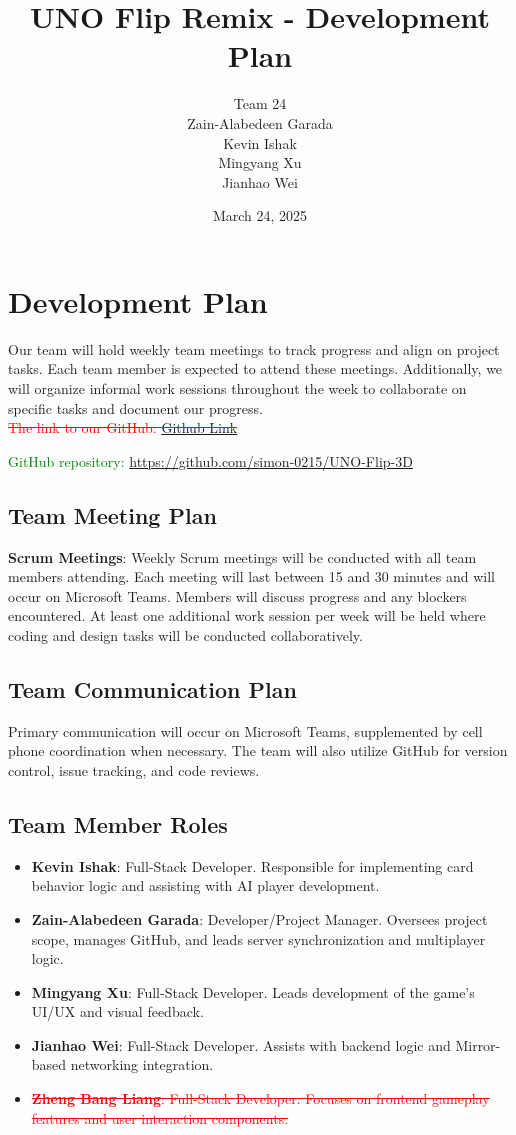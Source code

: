 \documentclass[12pt]{article}
\title{UNO Flip Remix - Development Plan}
\author{Team 24 \\ Zain-Alabedeen Garada \\ Kevin Ishak \\ Mingyang Xu \\ Jianhao Wei \\ \removed{Zheng Bang Liang}}
\date{March 24, 2025}
\newcommand{\removed}[1]{\textcolor{red}{\sout{#1}}}
\newcommand{\added}[1]{\textcolor{green}{#1}}
\begin{document}
\maketitle

\section*{Development Plan}

Our team will hold weekly team meetings to track progress and align on project tasks. Each team member is expected to attend these meetings. Additionally, we will organize informal work sessions throughout the week to collaborate on specific tasks and document our progress.\\
\removed{The link to our GitHub: \href{https://github.com/zgarada/team24_capstone}{Github Link}}\\
\item \added{GitHub repository: \href{https://github.com/simon-0215/UNO-Flip-3D}{https://github.com/simon-0215/UNO-Flip-3D}}

\subsection*{Team Meeting Plan}
\textbf{Scrum Meetings}: Weekly Scrum meetings will be conducted with all team members attending. Each meeting will last between 15 and 30 minutes and will occur on Microsoft Teams. Members will discuss progress and any blockers encountered. At least one additional work session per week will be held where coding and design tasks will be conducted collaboratively.

\subsection*{Team Communication Plan}
Primary communication will occur on Microsoft Teams, supplemented by cell phone coordination when necessary. The team will also utilize GitHub for version control, issue tracking, and code reviews.

\subsection*{Team Member Roles}
\begin{itemize}
    \item \textbf{Kevin Ishak}: Full-Stack Developer. Responsible for implementing card behavior logic and assisting with AI player development.
    \item \textbf{Zain-Alabedeen Garada}: Developer/Project Manager. Oversees project scope, manages GitHub, and leads server synchronization and multiplayer logic.
    \item \textbf{Mingyang Xu}: Full-Stack Developer. Leads development of the game’s UI/UX and visual feedback.
    \item \textbf{Jianhao Wei}: Full-Stack Developer. Assists with backend logic and Mirror-based networking integration.
    \item \removed{ \textbf{Zheng Bang Liang}: Full-Stack Developer. Focuses on frontend gameplay features and user interaction components.}
\end{itemize}
\end{document}
